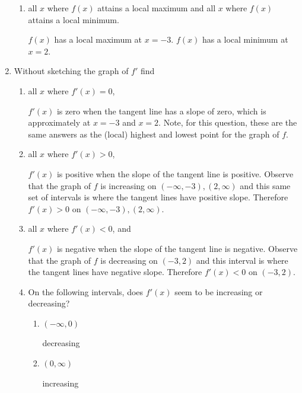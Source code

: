 \documentclass[nooutcomes,handout]{ximera}
\begin{document}
\begin{problem}
\begin{enumerate}
\begin{enumerate}
        \item
          all $x$ where $f(x)$ attains a local maximum and all $x$ where $f(x)$ attains a local minimum.
          \begin{freeResponse}
            $f(x)$ has a local maximum at $x=-3$.
            $f(x)$ has a local minimum at $x=2$.
          \end{freeResponse}
      \end{enumerate}

    \item

      Without sketching the graph of $f'$ find
      \begin{enumerate}
        \item 
          all $x$ where $f'(x) = 0$,
          \begin{freeResponse}
            $f'(x)$ is zero when the tangent line has a slope of zero, which is approximately at $x=-3$ and $x=2$.
            Note, for this question, these are the same answers as the (local) highest and lowest point for the graph of $f$.   
          \end{freeResponse}

        \item
          all $x$ where $f'(x) > 0$,
          \begin{freeResponse}
            ${f}'(x)$ is positive when the slope of the tangent line is positive.
            Observe that the graph of $f$ is increasing on $(-\infty ,-3), (2,\infty)$ and this same set of intervals is where the tangent lines have positive slope.
            Therefore $f'(x) > 0$ on $(-\infty ,-3), (2,\infty)$.
          \end{freeResponse}
        
        \item
          all $x$ where $f'(x) < 0$, and
          \begin{freeResponse}
            ${f}'(x)$ is negative when the slope of the tangent line is negative.
            Observe that the graph of $f$ is decreasing on $(-3,2)$ and this interval is where the tangent lines have negative slope.
            Therefore $f'(x) < 0$ on $(-3,2)$.
          \end{freeResponse}

        \item
          On the following intervals, does $f'(x)$ seem to be increasing or decreasing?
         
            \begin{enumerate}
		\item $(-\infty,0)$
			 \begin{freeResponse}
				decreasing
			  \end{freeResponse}
		\item $(0,\infty)$
			 \begin{freeResponse}
				increasing
			  \end{freeResponse}
	\end{enumerate}


\end{enumerate}
\end{enumerate}
\end{problem}
\end{document}
